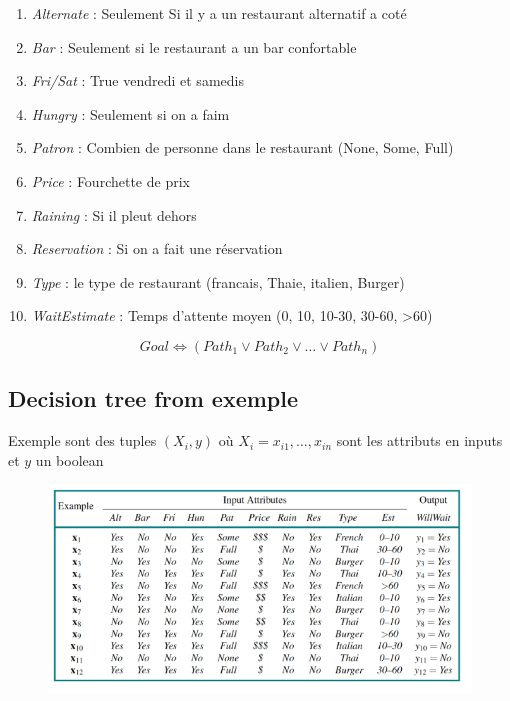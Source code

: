 \documentclass[12pt]{article}
\begin{document}
		\begin{enumerate}
			\item \textit{Alternate} : Seulement Si il y a un restaurant alternatif a coté
			\item \textit{Bar} : Seulement si le restaurant a un bar confortable
			\item \textit{Fri/Sat} : True vendredi et samedis
			\item \textit{Hungry} : Seulement si on a faim
			\item \textit{Patron} : Combien de personne dans le restaurant (None, Some, Full)
			\item \textit{Price} : Fourchette de prix
			\item \textit{Raining} : Si il pleut dehors
			\item \textit{Reservation} : Si on a fait une réservation
			\item \textit{Type} : le type de restaurant (francais, Thaie, italien, Burger)
			\item \textit{WaitEstimate} : Temps d'attente moyen (0, 10, 10-30, 30-60, >60)
		\end{enumerate}
		
		\begin{equation}
			Goal \Leftrightarrow (Path_1 \lor Path_2 \lor \dots \lor Path_n)
		\end{equation}
		
	\subsection{Decision tree from exemple}
	
		Exemple sont des tuples $(X_i, y)$ où $X_i = x_{i1},\dots,x_{in}$ sont les attributs en inputs et $y$ un boolean
		
		\begin{figure}[H]
			\centering
			\includegraphics[width=.8\textwidth]{img/DCFE.png}
		\end{figure}
		
\end{document}
